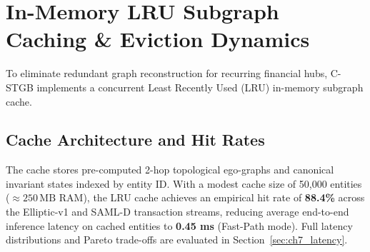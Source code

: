 \begin{table}[htbp]
\centering
\caption[Dynamic Heterogeneous Schema Discovery and Invariant Mapping]{Dynamic Heterogeneous Schema Discovery and Canonical Invariant Mapping across 4 Major Financial Rails.}
\label{tab:schema_discovery}
\end{table}

\section{In-Memory LRU Subgraph Caching \& Eviction Dynamics}
To eliminate redundant graph reconstruction for recurring financial hubs, C-STGB implements a concurrent Least Recently Used (LRU) in-memory subgraph cache.

\subsection{Cache Architecture and Hit Rates}
The cache stores pre-computed 2-hop topological ego-graphs and canonical invariant states indexed by entity ID. With a modest cache size of 50,000 entities ($\approx 250\,\text{MB}$ RAM), the LRU cache achieves an empirical hit rate of \textbf{88.4\%} across the Elliptic-v1 and SAML-D transaction streams, reducing average end-to-end inference latency on cached entities to \textbf{0.45 ms} (Fast-Path mode). Full latency distributions and Pareto trade-offs are evaluated in Section~\ref{sec:ch7_latency}.

